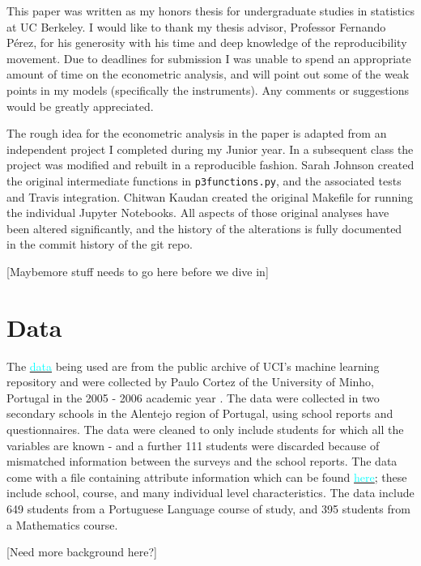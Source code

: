 \documentclass[12pt]{article}
\newcommand{\inlinecode}{\texttt}
\begin{document}
This paper was written as my honors thesis for undergraduate studies in statistics at UC Berkeley. I would like to thank my thesis advisor, Professor Fernando P\'erez, for his generosity with his time and deep knowledge of the reproducibility movement. Due to deadlines for submission I was unable to spend an appropriate amount of time on the econometric analysis, and will point out some of the weak points in my models (specifically the instruments). Any comments or suggestions would be greatly appreciated. 

The rough idea for the econometric analysis in the paper is adapted from an independent project I completed during my Junior year. In a subsequent class the project was modified and rebuilt in a reproducible fashion. Sarah Johnson created the original intermediate functions in \inlinecode{p3functions.py}, and the associated tests and Travis integration. Chitwan Kaudan created the original Makefile for running the individual Jupyter Notebooks. All aspects of those original analyses have been altered significantly, and the history of the alterations is fully documented in the commit history of the git repo.

\textcolor{BrickRed}{[Maybemore stuff needs to go here before we dive in]}


\newpage
\section{Data}
The \href{https://archive.ics.uci.edu/ml/datasets/Student+Performance#}{\textcolor{cyan}{data}} being used are from the public archive of UCI's machine learning repository and were collected by Paulo Cortez of the University of Minho, Portugal in the 2005 - 2006 academic year \citep{data_paper}. The data were collected in two secondary schools in the Alentejo region of Portugal, using school reports and questionnaires. The data were cleaned to only include students for which all the variables are known - and a further 111 students were discarded because of mismatched information between the surveys and the school reports. The data come with a file containing attribute information which can be found \href{https://archive.ics.uci.edu/ml/datasets/Student+Performance#}{\textcolor{cyan}{here}}; these include school, course, and many individual level characteristics. The data include 649 students from a Portuguese Language course of study, and 395 students from a Mathematics course. 

\textcolor{BrickRed}{[Need more background here?]}
\end{document}
